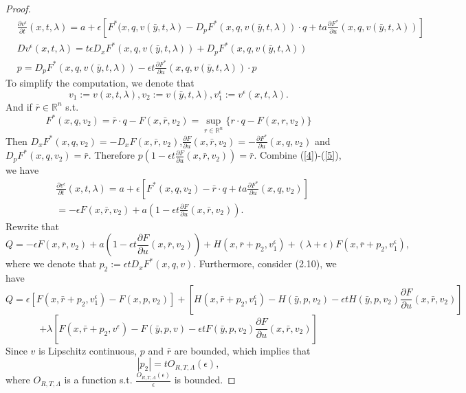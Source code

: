 \documentclass[preprint]{elsarticle}
\numberwithin{equation}{section}
\begin{document}
\begin{proof}
    \begin{align}
        & \frac{\partial v^{\epsilon}}{\partial t}(x,t,\lambda)=a+\epsilon[F^*(x,q,v(\bar y,t,\lambda)-D_pF^*(x,q,v(\bar y,t,\lambda)) \cdot q+ta \frac{\partial F^*}{\partial u}(x,q,v(\bar y,t,\lambda))]\label{4}\\
        &Dv^{\epsilon}(x,t,\lambda)=t\epsilon D_xF^*(x,q,v(\bar y,t,\lambda))+D_pF^*(x,q,v(\bar y,t,\lambda))\\
        &p=D_pF^*(x,q,v(\bar y,t,\lambda))-\epsilon t\frac{\partial F^*}{\partial u}(x,q,v(\bar y,t,\lambda))\cdot p
    \end{align}
    To simplify the computation, we denote that 
    \begin{equation}
        v_1:=v(x,t,\lambda),v_2:=v(\bar y,t,\lambda),v^{\epsilon}_1:=v^{\epsilon}(x,t,\lambda).\label{5}
    \end{equation}
    And if $\bar r \in \mathbb R^n$ s.t.
    \begin{equation}
        F^*(x,q,v_2)=\bar r \cdot q-F(x,\bar r,v_2)=\underset{r\in \mathbb R^n}{\sup} \{r\cdot q-F(x,r,v_2)\}
    \end{equation}
    Then $D_xF^*(x,q,v_2)=-D_xF(x,\bar r,v_2)$,$\frac{\partial F}{\partial u}(x,\bar r,v_2)=-\frac{\partial F^*}{\partial u}(x,q,v_2)$ and $D_pF^*(x,q,v_2)=\bar r$. Therefore $p(1-\epsilon t\frac{\partial F}{\partial u}(x,\bar r,v_2))=\bar r$. Combine (\ref{4})-(\ref{5}), we have
    \begin{align*}
        &\frac{\partial v^{\epsilon}}{\partial t}(x,t,\lambda)=a+\epsilon[F^*(x,q,v_2)-\bar r \cdot q+ta \frac{\partial F^*}{\partial u}(x,q,v_2)]\\
        &=-\epsilon F(x,\bar r,v_2)+a(1-\epsilon t\frac{\partial F}{\partial u}(x,\bar r,v_2)).
    \end{align*}
    Rewrite that 
    \begin{equation}
        Q=-\epsilon F(x,\bar r,v_2)+a(1-\epsilon t\frac{\partial F}{\partial u}(x,\bar r,v_2))+H(x,\bar r+p_2,v^{\epsilon}_1)+(\lambda+\epsilon)F(x,\bar r+p_2,v^{\epsilon}_1),
    \end{equation}
    where we denote that $p_2:=\epsilon tD_xF^*(x,q,v)$. Furthermore, consider (2.10), we have 
    \begin{equation*}
        Q=\epsilon[F(x,\bar r+p_2,v^{\epsilon}_1)-F(x,p,v_2)]+[H(x,\bar r+p_2,v^{\epsilon}_1)-H(\bar y,p,v_2)-\epsilon tH(\bar y,p,v_2)\frac{\partial F}{\partial u}(x,\bar r,v_2)]
    \end{equation*}
    \begin{equation}
        +\lambda [F(x,\bar r+p_2,v^{\epsilon})-F(\bar y,p,v)-\epsilon tF(\bar y,p,v_2)\frac{\partial F}{\partial u}(x,\bar r,v_2)]
    \end{equation}
    Since $v$ is Lipschitz continuous, $p$ and $\bar r$ are bounded, which implies that 
    \begin{equation}
        |p_2|=tO_{R,T,\Lambda}(\epsilon),
    \end{equation}
    where $O_{R,T,\Lambda}$ is a function s.t. $\frac{O_{R,T,\Lambda}(\epsilon)}{\epsilon}$ is bounded.
   

\end{proof}
\end{document}
